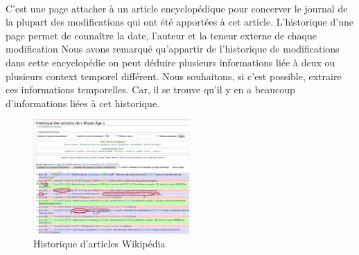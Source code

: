 \documentclass[12pt,a4	]{report}
\begin{document}
\paragraph{}
C'est une page attacher à un article encyclopédique pour concerver le journal de la plupart des modifications qui ont été apportées à cet article. L'historique d'une page permet de connaître la date, l'auteur et la teneur externe de chaque modification 
Nous avons remarqué qu'appartir de l'historique de modifications dans cette encyclopédie on peut déduire plusieurs informations liée à deux ou plusieurs context temporel différent.
Nous souhaitons, si c’est possible, extraire ces informations temporelles. Car, il se trouve qu’il y en a beaucoup d’informations liées à cet historique.
\begin{figure}[H]
\centering
\includegraphics[width=6cm]{Historique_articles.jpg}
\caption{Historique d'articles Wikipédia}
\end{figure}
\newpage
\end{document}
